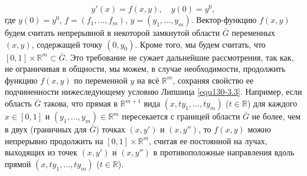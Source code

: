\begin{equation}\label{equ130-3.1}
y'(x)=f(x,y), \quad y(0)=y^0,
\end{equation}
где $y(0)=y^0$,  $f=(f_1, \ldots, f_m)$, $y=(y_1, \ldots, y_m)$. Вектор-функцию   $f(x,y)$  будем считать непрерывной в некоторой замкнутой  области $\bar G$ переменных $(x,y)$, содержащей точку $(0,y_0)$. Кроме того, мы будем  считать, что  $[0,1]\times\mathbb{R}^m\subset\bar G$. Это требование не сужает дальнейшие рассмотрения, так как, не ограничивая в общности,  мы можем, в случае необходимости, продолжить функцию $f(x,y)$ по переменной $y$ на всё $\mathbb{R}^m$, сохраняя свойство ее подчиненности  нижеследующему условию Липшица \eqref{equ130-3.3}. Например, если область $\bar G$ такова, что  прямая в $\mathbb{R}^{m+1}$ вида $(x,ty_1,\ldots,ty_m)$ ($t\in\mathbb{R}$) для каждого $x\in[0,1]$ и $(y_1,\ldots,y_m)\in\mathbb{R}^{m}$ пересекается с границей области $\bar G$ не более, чем в двух (граничных для $\bar G$) точках $(x,y')$ и $(x,y'')$, то  $f(x,y)$ можно непрерывно продолжить   на $[0,1]\times\mathbb{R}^m$, считая ее  постоянной на лучах, выходящих из точек  $(x,y')$ и $(x,y'')$ в противоположные направления вдоль прямой $(x,ty_1,\ldots,ty_m)$ ($t\in\mathbb{R}$).

